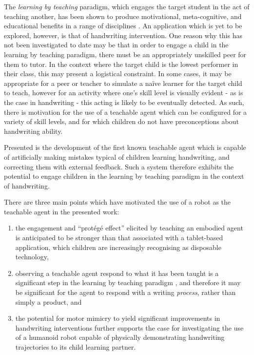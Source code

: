 \documentclass{sig-alternate}
\begin{document}
The \emph{learning by teaching} paradigm, which engages the target student in
the act of teaching another, has been shown to produce motivational,
meta-cognitive, and educational benefits in a range of disciplines
\cite{Rohrbeck2003}. An application which is yet to be explored, however, is
that of handwriting intervention. One reason why this has not been investigated
to date may be that in order to engage a child in the learning by teaching
paradigm, there must be an appropriately unskilled peer for them to tutor. In
the context where the target child is the lowest performer in their class, this
may present a logistical constraint. In some cases, it may be appropriate for a
peer or teacher to simulate a na\"ive learner for the target child to teach,
however for an activity where one's skill level is visually evident - as is the
case in handwriting - this acting is likely to be eventually detected. As such,
there is motivation for the use of a teachable agent which can be configured for
a variety of skill levels, and for which children do not have preconceptions
about handwriting ability.

Presented is the development of the first known teachable agent which is capable
of artificially making mistakes typical of children learning handwriting, and
correcting them with external feedback. Such a system therefore exhibits the potential
to engage children in the learning by teaching paradigm in the context of
handwriting. 

There are three main points which have motivated the use of a robot as the
teachable agent in the presented work:

\begin{enumerate}
    \item the engagement and ``protégé effect'' elicited by teaching an embodied
        agent is anticipated to be stronger than that associated with a
        tablet-based application, which children are increasingly recognising as
        disposable technology,%
%
%

    \item observing a teachable agent respond to what it has been taught
        is a significant step in the learning by teaching
        paradigm \cite{Okita2006}, and therefore it may be significant for the agent to respond
        with a writing \emph{process}, rather than simply a product, and

    \item the potential for motor mimicry to yield significant improvements in
        handwriting interventions \cite{Berninger1997} further supports the case
        for investigating the use of a humanoid robot capable of physically
        demonstrating handwriting trajectories to its child learning partner.
\end{enumerate}
\end{document}
